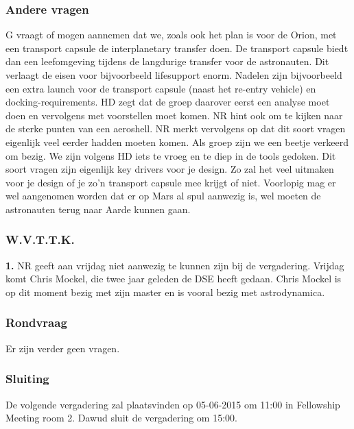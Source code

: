 \subsubsection{Andere vragen}
G vraagt of mogen aannemen dat we, zoals ook het plan is voor de Orion, met een transport capsule de interplanetary transfer doen. De transport capsule biedt dan een leefomgeving tijdens de langdurige transfer voor de astronauten. Dit verlaagt de eisen voor bijvoorbeeld lifesupport enorm. Nadelen zijn bijvoorbeeld een extra launch voor de transport capsule (naast het re-entry vehicle) en docking-requirements. HD zegt dat de groep daarover eerst een analyse moet doen en vervolgens met voorstellen moet komen. NR hint ook om te kijken naar de sterke punten van een aeroshell.
\newline
NR merkt vervolgens op dat dit soort vragen eigenlijk veel eerder hadden moeten komen. Als groep zijn we een beetje verkeerd om bezig. We zijn volgens HD iets te vroeg en te diep in de tools gedoken. Dit soort vragen zijn eigenlijk key drivers voor je design. Zo zal het veel uitmaken voor je design of je zo'n transport capsule mee krijgt of niet. Voorlopig mag er wel aangenomen worden dat er op Mars al spul aanwezig is, wel moeten de astronauten terug naar Aarde kunnen gaan.

\subsubsection{W.V.T.T.K.}

\textbf{1.} NR geeft aan vrijdag niet aanwezig te kunnen zijn bij de vergadering. Vrijdag komt Chris Mockel, die twee jaar geleden de DSE heeft gedaan. Chris Mockel is op dit moment bezig met zijn master en is vooral bezig met astrodynamica.

\subsubsection{Rondvraag}
Er zijn verder geen vragen.

\subsubsection{Sluiting}
De volgende vergadering zal plaatsvinden op 05-06-2015 om 11:00 in Fellowship Meeting room 2.
\newline\newline
Dawud sluit de vergadering om 15:00.
